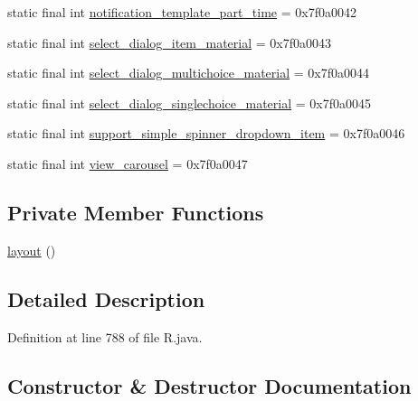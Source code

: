 \begin{DoxyCompactItemize}
\item 
static final int \mbox{\hyperlink{classcom_1_1synnapps_1_1carouselview_1_1_r_1_1layout_a200d8fe066bf1aeecfe02a7eb877a3f5}{notification\+\_\+template\+\_\+part\+\_\+time}} = 0x7f0a0042
\item 
static final int \mbox{\hyperlink{classcom_1_1synnapps_1_1carouselview_1_1_r_1_1layout_a542d73cfbed890071b9ede482476f613}{select\+\_\+dialog\+\_\+item\+\_\+material}} = 0x7f0a0043
\item 
static final int \mbox{\hyperlink{classcom_1_1synnapps_1_1carouselview_1_1_r_1_1layout_a3cafa22527d16ff1f515418cbbdc9931}{select\+\_\+dialog\+\_\+multichoice\+\_\+material}} = 0x7f0a0044
\item 
static final int \mbox{\hyperlink{classcom_1_1synnapps_1_1carouselview_1_1_r_1_1layout_a12bee3aa1df337501204f2fffac69349}{select\+\_\+dialog\+\_\+singlechoice\+\_\+material}} = 0x7f0a0045
\item 
static final int \mbox{\hyperlink{classcom_1_1synnapps_1_1carouselview_1_1_r_1_1layout_a5a26397522f2bdbc1d22ebb16c274704}{support\+\_\+simple\+\_\+spinner\+\_\+dropdown\+\_\+item}} = 0x7f0a0046
\item 
static final int \mbox{\hyperlink{classcom_1_1synnapps_1_1carouselview_1_1_r_1_1layout_a6d9537890b32e70686d76cdbb4712975}{view\+\_\+carousel}} = 0x7f0a0047
\end{DoxyCompactItemize}
\subsection*{Private Member Functions}
\begin{DoxyCompactItemize}
\item 
\mbox{\hyperlink{classcom_1_1synnapps_1_1carouselview_1_1_r_1_1layout_a2b78dfb67976ea370de4984c6502f479}{layout}} ()
\end{DoxyCompactItemize}


\subsection{Detailed Description}


Definition at line 788 of file R.\+java.



\subsection{Constructor \& Destructor Documentation}
\mbox{\label{classcom_1_1synnapps_1_1carouselview_1_1_r_1_1layout_a2b78dfb67976ea370de4984c6502f479}} 
